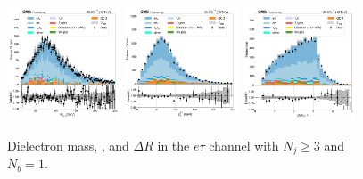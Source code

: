 \begin{figure}[htb!]
    \centering
    \includegraphics[width=0.3\textwidth]{chapters/Analysis/sectionPlots/figures/data_mc_overlays/etau_2016_cat_gt3_eq1_signal_linear_lepton_dilepton1_mass}
    \includegraphics[width=0.3\textwidth]{chapters/Analysis/sectionPlots/figures/data_mc_overlays/etau_2016_cat_gt3_eq1_signal_linear_lepton_dilepton1_pt}
    \includegraphics[width=0.3\textwidth]{chapters/Analysis/sectionPlots/figures/data_mc_overlays/etau_2016_cat_gt3_eq1_signal_linear_lepton_dilepton1_delta_r}
    \caption{Dielectron mass, \pt, and $\Delta R$ in the $e\tau$ channel
    with $N_{j} \geq 3$ and $N_{b} = 1$.}
    \label{fig:analysis:plots:etau_7_dilepton}
\end{figure}

